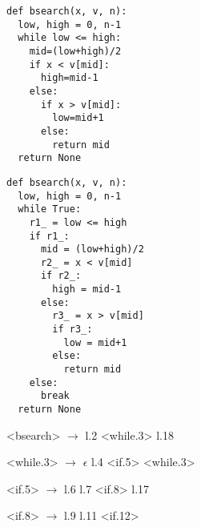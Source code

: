\begin{figure} %
\begin{subfigure}[h]{0.24\textwidth} %
\begin{lstlisting}[style=Python, escapechar=|,numbersep=2pt]
def bsearch(x, v, n):
  low, high = 0, n-1
  while low <= high:
    mid=(low+high)/2
    if x < v[mid]:
      high=mid-1
    else:
      if x > v[mid]:
        low=mid+1
      else:
        return mid
  return None
\end{lstlisting}
\vspace{60pt}
\end{subfigure}
\begin{subfigure}[h]{0.29\textwidth} %
\begin{lstlisting}[style=Python, escapechar=|,numbersep=2pt]
def bsearch(x, v, n):
  low, high = 0, n-1
  while True:
    r1_ = low <= high
    if r1_:
      mid = (low+high)/2
      r2_ = x < v[mid]
      if r2_:
        high = mid-1
      else:
        r3_ = x > v[mid]
        if r3_:
          low = mid+1
        else:
          return mid
    else:
      break
  return None
\end{lstlisting}
\end{subfigure}
\begin{subfigure}[h]{0.28\textwidth}   %
\begin{grammar}%
  <bsearch> $\rightarrow$ l.2 <while.3> l.18

  <while.3> $\rightarrow$ $\epsilon$
   \alt l.4 <if.5> <while.3>

  <if.5>    $\rightarrow$ l.6 l.7 <if.8>
   \alt l.17

  <if.8> $\rightarrow$ l.9
   \alt l.11 <if.12>


\end{grammar}
\end{subfigure}
\end{figure}
